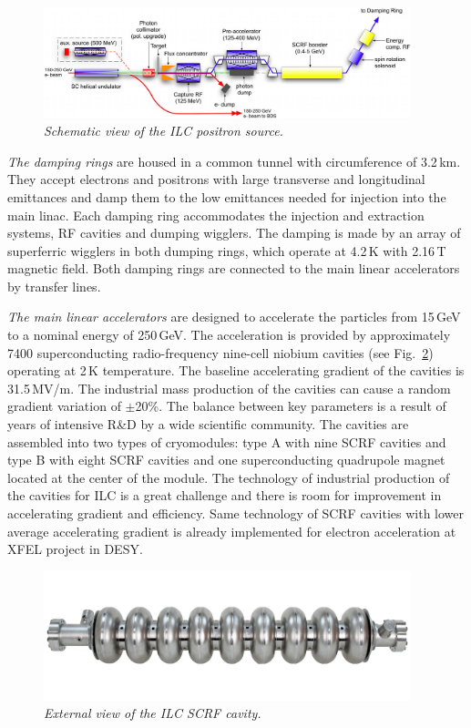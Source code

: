 \begin{figure}[H]
{\centering
    \includegraphics[width=0.95\textwidth]{graphics/ILCeplus.jpg}
    \caption{\sl Schematic view of the ILC positron source.}
    \label{fig:ILCeplus}
  }
\end{figure}

\textit{The damping rings} are housed in a common tunnel with circumference of 3.2\,km. They accept electrons and positrons with large transverse and longitudinal emittances and damp them to the low emittances needed for injection into the main linac. 
Each damping ring accommodates the injection and extraction systems, RF cavities and dumping wigglers.
The damping is made by an array of superferric wigglers in both dumping rings, which operate at 4.2\,K with 2.16\,T magnetic field. 
Both damping rings are connected to the main linear accelerators by transfer lines.

\textit{The main linear accelerators} are designed to accelerate the particles from 15\,GeV to a nominal energy of 250\,GeV. 
The acceleration is provided by approximately 7400 superconducting radio-frequency nine-cell niobium cavities (see Fig.~\ref{fig:ILCcavity}) operating at 2\,K temperature. 
The baseline accelerating gradient of the cavities is 31.5\,MV/m. 
The industrial mass production of the cavities can cause a random gradient variation of $\pm$20\%. 
The balance between key parameters is a result of years of intensive R\&D by a wide scientific community. 
The cavities are assembled into two types of cryomodules: type A with nine SCRF cavities and type B with eight SCRF cavities and one superconducting quadrupole magnet located at the center of the module. 
The technology of industrial production of the cavities for ILC is a great challenge and there is room for improvement in accelerating gradient and efficiency. 
Same technology of SCRF cavities with lower average accelerating gradient is already implemented for electron acceleration at XFEL project in DESY. 
\begin{figure}[H]
{\centering
    \includegraphics[width=0.95\textwidth]{graphics/Cavity.jpg}
    \caption{\sl External view of the ILC SCRF cavity.}
    \label{fig:ILCcavity}
  }
\end{figure}

